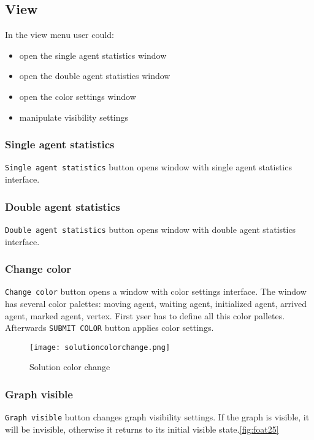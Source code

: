 \documentclass[thesis=B,english]{FITthesis}[2019/12/23]
\begin{document}
\subsection{View}

In the view menu user could:
\begin{itemize}
\item open the single agent statistics window
\item open the double agent statistics window
\item open the color settings window
\item manipulate visibility settings
\end{itemize}


\subsubsection{Single agent statistics}

\verb|Single agent statistics| button opens window with single agent statistics interface.

\subsubsection{Double agent statistics}

\verb|Double agent statistics| button opens window with double agent statistics interface.

\subsubsection{Change color}

\verb|Change color| button opens a window with color settings interface. The window  
has several color\label{fig:float24} palettes: moving agent, waiting agent, initialized agent, arrived agent, marked agent, vertex. First yser has to define all this color palletes. Afterwards \verb|SUBMIT COLOR| button applies color settings.   

\begin{figure}
	\texttt{[image: solutioncolorchange.png]}
	\caption[Solution color change]{Solution color change}\label{fig:float24}
\end{figure}

\subsubsection{Graph visible}

\verb|Graph visible| button changes graph visibility settings. If the graph is visible, it will be invisible, otherwise it returns to its initial visible state.\ref{fig:foat25}
\end{document}
